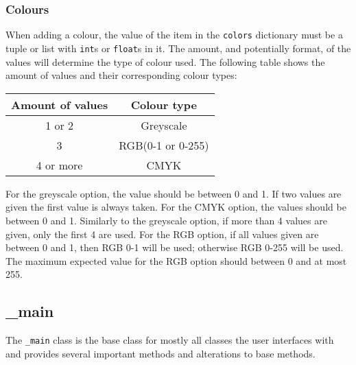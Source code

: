 \documentclass{article}
\begin{document}
\subsubsection{Colours}\label{subsubsec:colours}
When adding a colour, the value of the item in the \verb|colors| dictionary must be a tuple or list with \verb|int|s or \verb|float|s in it. The amount, and potentially format, of the values will determine the type of colour used. The following table shows the amount of values and their corresponding colour types:
\begin{center}
\begin{tabular}{| c | c |}
\hline
Amount of values & Colour type \\ \hline
1 or 2 & Greyscale \\
3 & RGB(0-1 or 0-255) \\
4 or more & CMYK \\
\hline
\end{tabular}
\end{center}
For the greyscale option, the value should be between 0 and 1. If two values are given the first value is always taken. For the CMYK option, the values should be between 0 and 1. Similarly to the greyscale option, if more than 4 values are given, only the first 4 are used. For the RGB option, if all values given are between 0 and 1, then RGB 0-1 will be used; otherwise RGB 0-255 will be used. The maximum expected value for the RGB option should between 0 and at most 255.
\subsection{\_main}\label{subsec:_main}
The \verb|_main| class is the base class for mostly all classes the user interfaces with and provides several important methods and alterations to base methods.
\end{document}
